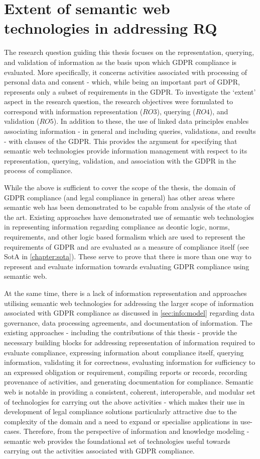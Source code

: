 \section{Extent of semantic web technologies in addressing RQ}
The research question guiding this thesis focuses on the representation, querying, and validation of information as the basis upon which GDPR compliance is evaluated.
More specifically, it concerns activities associated with processing of personal data and consent - which, while being an important part of GDPR, represents only a subset of requirements in the GDPR.
To investigate the `extent' aspect in the research question, the research objectives were formulated to correspond with information representation ($RO3$), querying ($RO4$), and validation ($RO5$).
In addition to these, the use of linked data principles enables associating  information - in general and including queries, validations, and results - with clauses of the GDPR.
This provides the argument for specifying that semantic web technologies provide information management with respect to its representation, querying, validation, and association with the GDPR in the process of compliance.

While the above is sufficient to cover the scope of the thesis, the domain of GDPR compliance (and legal compliance in general) has other areas where semantic web has been demonstrated to be capable from analysis of the state of the art.
Existing approaches have demonstrated use of semantic web technologies in representing information regarding compliance as deontic logic, norms, requirements, and other logic based formalism which are used to represent the requirements of GDPR and are evaluated as a measure of compliance itself (see SotA in \autoref{chapter:sota}).
These serve to prove that there is more than one way to represent and evaluate information towards evaluating GDPR compliance using semantic web.

At the same time, there is a lack of information representation and approaches utilising semantic web technologies for addressing the larger scope of information associated with GDPR compliance as discussed in \autoref{sec:info:model} regarding data governance, data processing agreements, and documentation of information.
The existing approaches - including the contributions of this thesis - provide the necessary building blocks for addressing representation of information required to evaluate compliance, expressing information about compliance itself, querying information, validating it for correctness, evaluating information for sufficiency to an expressed obligation or requirement, compiling reports or records, recording provenance of activities, and generating documentation for compliance.
Semantic web is notable in providing a consistent, coherent, interoperable, and modular set of technologies for carrying out the above activities - which makes their use in development of legal compliance solutions particularly attractive due to the complexity of the domain and a need to expand or specialise applications in use-cases.
Therefore, from the perspective of information and knowledge modeling - semantic web provides the foundational set of technologies useful towards carrying out the activities associated with GDPR compliance.


